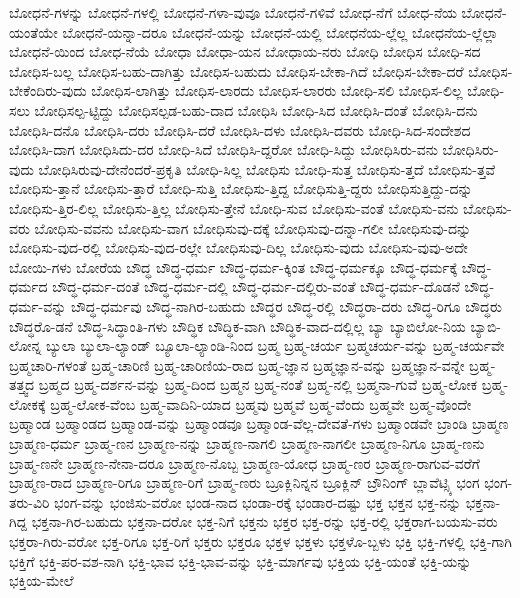 {ಬೋಧನೆ-ಗಳನ್ನು
ಬೋಧನೆ-ಗಳಲ್ಲಿ
ಬೋಧನೆ-ಗಳಾ-ವುವೂ
ಬೋಧನೆ-ಗಳಿವೆ
ಬೋಧ-ನೆಗೆ
ಬೋಧ-ನೆಯ
ಬೋಧನೆ-ಯಂತೆಯೇ
ಬೋಧನೆ-ಯನ್ನಾ-ದರೂ
ಬೋಧನೆ-ಯನ್ನು
ಬೋಧನೆ-ಯಲ್ಲಿ
ಬೋಧನೆಯ-ಲ್ಲೆಲ್ಲ
ಬೋಧನೆಯ-ಲ್ಲೆಲ್ಲಾ
ಬೋಧನೆ-ಯಿಂದ
ಬೋಧ-ನೆಯೆ
ಬೋಧಾ
ಬೋಧಾ-ಯನ
ಬೋಧಾಯ-ನರು
ಬೋಧಿ
ಬೋಧಿಸ
ಬೋಧಿ-ಸದ
ಬೋಧಿಸ-ಬಲ್ಲ
ಬೋಧಿಸ-ಬಹು-ದಾಗಿತ್ತು
ಬೋಧಿಸ-ಬಹುದು
ಬೋಧಿಸ-ಬೇಕಾ-ಗಿದೆ
ಬೋಧಿಸ-ಬೇಕಾ-ದರೆ
ಬೋಧಿಸ-ಬೇಕೆಂದಿರು-ವುದು
ಬೋಧಿಸ-ಲಾಗಿತ್ತು
ಬೋಧಿಸ-ಲಾರದು
ಬೋಧಿಸ-ಲಾರರು
ಬೋಧಿ-ಸಲಿ
ಬೋಧಿಸ-ಲಿಲ್ಲ
ಬೋಧಿ-ಸಲು
ಬೋಧಿಸಲ್ಪ-ಟ್ಟಿದ್ದು
ಬೋಧಿಸಲ್ಪಡ-ಬಹು-ದಾದ
ಬೋಧಿಸಿ
ಬೋಧಿ-ಸಿದ
ಬೋಧಿಸಿ-ದಂತೆ
ಬೋಧಿಸಿ-ದನು
ಬೋಧಿಸಿ-ದನೊ
ಬೋಧಿಸಿ-ದರು
ಬೋಧಿಸಿ-ದರೆ
ಬೋಧಿಸಿ-ದಳು
ಬೋಧಿಸಿ-ದವರು
ಬೋಧಿ-ಸಿದ-ಸಂದೇಶದ
ಬೋಧಿಸಿ-ದಾಗ
ಬೋಧಿಸಿದು-ದರ
ಬೋಧಿ-ಸಿದೆ
ಬೋಧಿಸಿ-ದ್ದರೋ
ಬೋಧಿ-ಸಿದ್ದು
ಬೋಧಿಸಿರು-ವನು
ಬೋಧಿಸಿರು-ವುದು
ಬೋಧಿಸಿರುವು-ದೇನೆಂದರೆ-ಪ್ರಕೃತಿ
ಬೋಧಿ-ಸಿಲ್ಲ
ಬೋಧಿಸು
ಬೋಧಿ-ಸುತ್ತ
ಬೋಧಿಸು-ತ್ತದೆ
ಬೋಧಿಸು-ತ್ತವೆ
ಬೋಧಿಸು-ತ್ತಾನೆ
ಬೋಧಿಸು-ತ್ತಾರೆ
ಬೋಧಿ-ಸುತ್ತಿ
ಬೋಧಿಸು-ತ್ತಿದ್ದ
ಬೋಧಿಸುತ್ತಿ-ದ್ದರು
ಬೋಧಿಸುತ್ತಿದ್ದು-ದನ್ನು
ಬೋಧಿಸು-ತ್ತಿರ-ಲಿಲ್ಲ
ಬೋಧಿಸು-ತ್ತಿಲ್ಲ
ಬೋಧಿಸು-ತ್ತೇನೆ
ಬೋಧಿ-ಸುವ
ಬೋಧಿಸು-ವಂತೆ
ಬೋಧಿಸು-ವನು
ಬೋಧಿಸು-ವರು
ಬೋಧಿಸು-ವವನು
ಬೋಧಿಸು-ವಾಗ
ಬೋಧಿಸುವು-ದಕ್ಕೆ
ಬೋಧಿಸುವು-ದನ್ನಾ-ಗಲೀ
ಬೋಧಿಸುವು-ದನ್ನು
ಬೋಧಿಸು-ವುದ-ರಲ್ಲಿ
ಬೋಧಿಸು-ವುದ-ರಲ್ಲೇ
ಬೋಧಿಸುವು-ದಿಲ್ಲ
ಬೋಧಿಸು-ವುದು
ಬೋಧಿಸು-ವುವು-ಅದೇ
ಬೋಯಿ-ಗಳು
ಬೋರೆಯ
ಬೌದ್ಧ
ಬೌದ್ಧ-ಧರ್ಮ
ಬೌದ್ಧ-ಧರ್ಮ-ಕ್ಕಿಂತ
ಬೌದ್ಧ-ಧರ್ಮಕ್ಕೂ
ಬೌದ್ಧ-ಧರ್ಮಕ್ಕೆ
ಬೌದ್ಧ-ಧರ್ಮದ
ಬೌದ್ಧ-ಧರ್ಮ-ದಂತೆ
ಬೌದ್ಧ-ಧರ್ಮ-ದಲ್ಲಿ
ಬೌದ್ಧ-ಧರ್ಮ-ದಲ್ಲಿರು-ವಂತೆ
ಬೌದ್ಧ-ಧರ್ಮ-ದೊಡನೆ
ಬೌದ್ಧ-ಧರ್ಮ-ವನ್ನು
ಬೌದ್ಧ-ಧರ್ಮವು
ಬೌದ್ಧ-ನಾಗಿರ-ಬಹುದು
ಬೌದ್ಧರ
ಬೌದ್ಧ-ರಲ್ಲಿ
ಬೌದ್ಧರಾ-ದರು
ಬೌದ್ಧ-ರಿಗೂ
ಬೌದ್ಧರು
ಬೌದ್ಧರೊ-ಡನೆ
ಬೌದ್ಧ-ಸಿದ್ಧಾಂತಿ-ಗಳು
ಬೌದ್ಧಿಕ
ಬೌದ್ಧಿಕ-ವಾಗಿ
ಬೌದ್ಧಿಕ-ವಾದ-ದಲ್ಲಿಲ್ಲ
ಬ್ಯಾ
ಬ್ಯಾಬಿಲೋ-ನಿಯ
ಬ್ಯಾಬಿ-ಲೋನ್ನ
ಬ್ಯುಲಾ
ಬ್ಯುಲಾ-ಲ್ಯಾಂಡ್
ಬ್ಯೂಲಾ-ಲ್ಯಾಂಡಿ-ನಿಂದ
ಬ್ರಹ್ಮ
ಬ್ರಹ್ಮ-ಚರ್ಯ
ಬ್ರಹ್ಮಚರ್ಯ-ವನ್ನು
ಬ್ರಹ್ಮ-ಚರ್ಯವೇ
ಬ್ರಹ್ಮಚಾರಿ-ಗಳಂತೆ
ಬ್ರಹ್ಮ-ಚಾರಿಣಿ
ಬ್ರಹ್ಮ-ಚಾರಿಣಿಯ-ರಾದ
ಬ್ರಹ್ಮ-ಜ್ಞಾನ
ಬ್ರಹ್ಮಜ್ಞಾನ-ವನ್ನು
ಬ್ರಹ್ಮಜ್ಞಾನ-ವನ್ನೇ
ಬ್ರಹ್ಮ-ತತ್ತ್ವದ
ಬ್ರಹ್ಮದ
ಬ್ರಹ್ಮ-ದರ್ಶನ-ವನ್ನು
ಬ್ರಹ್ಮ-ದಿಂದ
ಬ್ರಹ್ಮನ
ಬ್ರಹ್ಮ-ನಂತೆ
ಬ್ರಹ್ಮ-ನಲ್ಲಿ
ಬ್ರಹ್ಮನಾ-ಗುವೆ
ಬ್ರಹ್ಮ-ಲೋಕ
ಬ್ರಹ್ಮ-ಲೋಕಕ್ಕೆ
ಬ್ರಹ್ಮ-ಲೋಕ-ವೆಂಬ
ಬ್ರಹ್ಮ-ವಾದಿನಿ-ಯಾದ
ಬ್ರಹ್ಮವು
ಬ್ರಹ್ಮವೆ
ಬ್ರಹ್ಮ-ವೆಂದು
ಬ್ರಹ್ಮವೇ
ಬ್ರಹ್ಮ-ವೊಂದೇ
ಬ್ರಹ್ಮಾಂಡ
ಬ್ರಹ್ಮಾಂಡದ
ಬ್ರಹ್ಮಾಂಡ-ವನ್ನು
ಬ್ರಹ್ಮಾಂಡವೂ
ಬ್ರಹ್ಮಾಂಡ-ವೆಲ್ಲ-ದೇವತೆ-ಗಳು
ಬ್ರಹ್ಮಾಂಡವೇ
ಬ್ರಾಂಡಿ
ಬ್ರಾಹ್ಮಣ
ಬ್ರಾಹ್ಮಣ-ಧರ್ಮ
ಬ್ರಾಹ್ಮ-ಣನ
ಬ್ರಾಹ್ಮಣ-ನನ್ನು
ಬ್ರಾಹ್ಮಣ-ನಾಗಲಿ
ಬ್ರಾಹ್ಮಣ-ನಾಗಲೀ
ಬ್ರಾಹ್ಮಣ-ನಿಗೂ
ಬ್ರಾಹ್ಮ-ಣನು
ಬ್ರಾಹ್ಮ-ಣನೇ
ಬ್ರಾಹ್ಮಣ-ನೇನಾ-ದರೂ
ಬ್ರಾಹ್ಮಣ-ನೊಬ್ಬ
ಬ್ರಾಹ್ಮಣ-ಯೋಧ
ಬ್ರಾಹ್ಮ-ಣರ
ಬ್ರಾಹ್ಮಣ-ರಾಗುವ-ವರೆಗೆ
ಬ್ರಾಹ್ಮಣ-ರಾದ
ಬ್ರಾಹ್ಮಣ-ರಿಗೂ
ಬ್ರಾಹ್ಮಣ-ರಿಗೆ
ಬ್ರಾಹ್ಮ-ಣರು
ಬ್ರೂಕ್ಲಿನಿನ್ನನ
ಬ್ರೂಕ್ಲಿನ್
ಬ್ರೌನಿಂಗ್
ಬ್ಲಾವೆಟ್ಸ್ಕಿ
ಭಂಗ
ಭಂಗ-ತರು-ವಿರಿ
ಭಂಗ-ವನ್ನು
ಭಂಜಿಸು-ವರೋ
ಭಂಡ-ನಾದ
ಭಂಡಾ-ರಕ್ಕೆ
ಭಂಡಾರ-ದಷ್ಟು
ಭಕ್ತ
ಭಕ್ತನ
ಭಕ್ತ-ನನ್ನು
ಭಕ್ತನಾ-ಗಿದ್ದ
ಭಕ್ತನಾ-ಗಿರ-ಬಹುದು
ಭಕ್ತನಾ-ದರೋ
ಭಕ್ತ-ನಿಗೆ
ಭಕ್ತನು
ಭಕ್ತರ
ಭಕ್ತ-ರನ್ನು
ಭಕ್ತ-ರಲ್ಲಿ
ಭಕ್ತರಾಗ-ಬಯಸು-ವರು
ಭಕ್ತರಾ-ಗಿರು-ವರೋ
ಭಕ್ತ-ರಿಗೂ
ಭಕ್ತ-ರಿಗೆ
ಭಕ್ತರು
ಭಕ್ತರೂ
ಭಕ್ತಳ
ಭಕ್ತಳು
ಭಕ್ತಳೊ-ಬ್ಬಳು
ಭಕ್ತಿ
ಭಕ್ತಿ-ಗಳಲ್ಲಿ
ಭಕ್ತಿ-ಗಾಗಿ
ಭಕ್ತಿಗೆ
ಭಕ್ತಿ-ಪರ-ವಶ-ನಾಗಿ
ಭಕ್ತಿ-ಭಾವ
ಭಕ್ತಿ-ಭಾವ-ವನ್ನು
ಭಕ್ತಿ-ಮಾರ್ಗವು
ಭಕ್ತಿಯ
ಭಕ್ತಿ-ಯಂತೆ
ಭಕ್ತಿ-ಯನ್ನು
ಭಕ್ತಿಯ-ಮೇಲೆ
}
